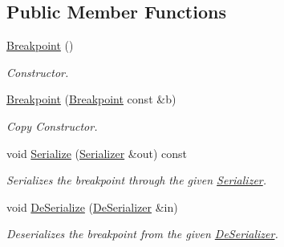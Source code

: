 \subsection*{Public Member Functions}
\begin{DoxyCompactItemize}
\item 
\hypertarget{class_common_1_1_breakpoint_a57e92a8c09ca8a7d86c21e900b9df14e}{\hyperlink{class_common_1_1_breakpoint_a57e92a8c09ca8a7d86c21e900b9df14e}{Breakpoint} ()}\label{class_common_1_1_breakpoint_a57e92a8c09ca8a7d86c21e900b9df14e}

\begin{DoxyCompactList}\small\item\em Constructor. \end{DoxyCompactList}\item 
\hypertarget{class_common_1_1_breakpoint_a31ab5c5a53a747d1026651dd3d38fa64}{\hyperlink{class_common_1_1_breakpoint_a31ab5c5a53a747d1026651dd3d38fa64}{Breakpoint} (\hyperlink{class_common_1_1_breakpoint}{Breakpoint} const \&b)}\label{class_common_1_1_breakpoint_a31ab5c5a53a747d1026651dd3d38fa64}

\begin{DoxyCompactList}\small\item\em Copy Constructor. \end{DoxyCompactList}\item 
\hypertarget{class_common_1_1_breakpoint_a6635c068cdda3928a48b282a8a4214e8}{void \hyperlink{class_common_1_1_breakpoint_a6635c068cdda3928a48b282a8a4214e8}{Serialize} (\hyperlink{class_common_1_1_serializer}{Serializer} \&out) const }\label{class_common_1_1_breakpoint_a6635c068cdda3928a48b282a8a4214e8}

\begin{DoxyCompactList}\small\item\em Serializes the breakpoint through the given \hyperlink{class_common_1_1_serializer}{Serializer}. \end{DoxyCompactList}\item 
\hypertarget{class_common_1_1_breakpoint_adcb23cf35fd14da188ba0369e029df95}{void \hyperlink{class_common_1_1_breakpoint_adcb23cf35fd14da188ba0369e029df95}{De\-Serialize} (\hyperlink{class_common_1_1_de_serializer}{De\-Serializer} \&in)}\label{class_common_1_1_breakpoint_adcb23cf35fd14da188ba0369e029df95}

\begin{DoxyCompactList}\small\item\em Deserializes the breakpoint from the given \hyperlink{class_common_1_1_de_serializer}{De\-Serializer}. \end{DoxyCompactList}\end{DoxyCompactItemize}

